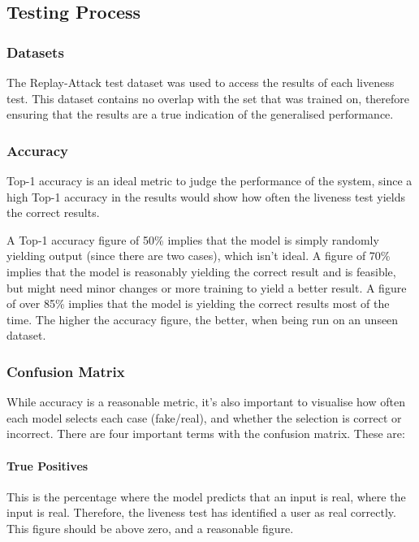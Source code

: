 \documentclass[10pt,a4paper]{article}
\begin{document}
\begin{figure}
   \end{figure}
    \subsection{Testing Process}
        \subsubsection{Datasets}
            The Replay-Attack test dataset was used to access the results of each liveness test. This dataset contains no overlap with the set that was trained on, therefore ensuring that
            the results are a true indication of the generalised performance.

        \subsubsection{Accuracy}
            Top-1 accuracy is an ideal metric to judge the performance of the system, since a high Top-1 accuracy in the results would show how often the liveness test yields the correct results.
            
            A Top-1 accuracy figure of 50\% implies that the model is simply randomly yielding output (since there are two cases), which isn't ideal. A figure of 70\% implies that the model
            is reasonably yielding the correct result and is feasible, but might need minor changes or more training to yield a better result. A figure of over 85\% implies that the model
            is yielding the correct results most of the time. The higher the accuracy figure, the better, when being run on an unseen dataset.

        \subsubsection{Confusion Matrix}
            While accuracy is a reasonable metric, it's also important to visualise how often each model selects each case (fake/real), and whether the selection is correct or incorrect.
            There are four important terms with the confusion matrix. These are:

            \paragraph{True Positives}
                This is the percentage where the model predicts that an input is real, where the input is real. Therefore, the liveness test has identified a user as real correctly.
                This figure should be above zero, and a reasonable figure. 
\end{document}
